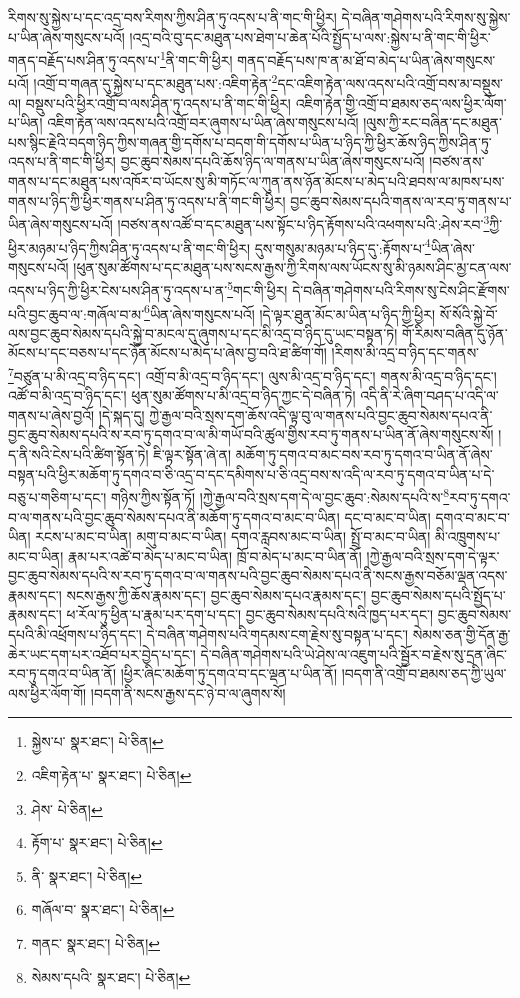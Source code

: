 རིགས་སུ་སྐྱེས་པ་དང་འདྲ་བས་རིགས་ཀྱིས་ཤིན་ཏུ་འདས་པ་ནི་གང་གི་ཕྱིར། དེ་བཞིན་གཤེགས་པའི་རིགས་སུ་སྐྱེས་པ་ཡིན་ཞེས་གསུངས་པའོ། །འདྲ་བའི་བུ་དང་མཐུན་པས་ཐེག་པ་ཆེན་པོའི་སྤྱོད་པ་ལས་:སྐྱེས་པ་ནི་གང་གི་ཕྱིར་གནད་བརྗོད་པས་ཤིན་ཏུ་འདས་པ་\footnote{སྐྱེས་པ་  སྣར་ཐང་།  པེ་ཅིན། }ནི་གང་གི་ཕྱིར། གནད་བརྗོད་པས་ཁ་ན་མ་ཐོ་བ་མེད་པ་ཡིན་ཞེས་གསུངས་པའོ། །འགྲོ་བ་གཞན་དུ་སྐྱེས་པ་དང་མཐུན་པས་:འཇིག་རྟེན་\footnote{འཇིག་རྟེན་པ་  སྣར་ཐང་།  པེ་ཅིན། }དང་འཇིག་རྟེན་ལས་འདས་པའི་འགྲོ་བས་མ་བསྡུས་ལ། བསྡུས་པའི་ཕྱིར་འགྲོ་བ་ལས་ཤིན་ཏུ་འདས་པ་ནི་གང་གི་ཕྱིར། འཇིག་རྟེན་གྱི་འགྲོ་བ་ཐམས་ཅད་ལས་ཕྱིར་ལོག་པ་ཡིན། འཇིག་རྟེན་ལས་འདས་པའི་འགྲོ་བར་ཞུགས་པ་ཡིན་ཞེས་གསུངས་པའོ། །ལུས་ཀྱི་རང་བཞིན་དང་མཐུན་པས་སྙིང་རྗེའི་བདག་ཉིད་ཀྱིས་གཞན་གྱི་དགོས་པ་བདག་གི་དགོས་པ་ཡིན་པ་ཉིད་ཀྱི་ཕྱིར་ཆོས་ཉིད་ཀྱིས་ཤིན་ཏུ་འདས་པ་ནི་གང་གི་ཕྱིར། བྱང་ཆུབ་སེམས་དཔའི་ཆོས་ཉིད་ལ་གནས་པ་ཡིན་ཞེས་གསུངས་པའོ། །བཙས་ནས་གནས་པ་དང་མཐུན་པས་འཁོར་བ་ཡོངས་སུ་མི་གཏོང་ལ་ཀུན་ནས་ཉོན་མོངས་པ་མེད་པའི་ཐབས་ལ་མཁས་པས་གནས་པ་ཉིད་ཀྱི་ཕྱིར་གནས་པ་ཤིན་ཏུ་འདས་པ་ནི་གང་གི་ཕྱིར། བྱང་ཆུབ་སེམས་དཔའི་གནས་ལ་རབ་ཏུ་གནས་པ་ཡིན་ཞེས་གསུངས་པའོ། །བཙས་ནས་འཚོ་བ་དང་མཐུན་པས་སྟོང་པ་ཉིད་རྟོགས་པའི་འཕགས་པའི་:ཤེས་རབ་\footnote{ཤེས་  པེ་ཅིན། }ཀྱི་ཕྱིར་མཉམ་པ་ཉིད་ཀྱིས་ཤིན་ཏུ་འདས་པ་ནི་གང་གི་ཕྱིར། དུས་གསུམ་མཉམ་པ་ཉིད་དུ་:རྟོགས་པ་\footnote{རྟོག་པ་  སྣར་ཐང་།  པེ་ཅིན། }ཡིན་ཞེས་གསུངས་པའོ། །ཕུན་སུམ་ཚོགས་པ་དང་མཐུན་པས་སངས་རྒྱས་ཀྱི་རིགས་ལས་ཡོངས་སུ་མི་ཉམས་ཤིང་མྱ་ངན་ལས་འདས་པ་ཉིད་ཀྱི་ཕྱིར་ངེས་པས་ཤིན་ཏུ་འདས་པ་ན་\footnote{ནི་  སྣར་ཐང་།  པེ་ཅིན། }གང་གི་ཕྱིར། དེ་བཞིན་གཤེགས་པའི་རིགས་སུ་ངེས་ཤིང་རྫོགས་པའི་བྱང་ཆུབ་ལ་:གཞོལ་བ་མ་\footnote{གཞོལ་བ་  སྣར་ཐང་།  པེ་ཅིན། }ཡིན་ཞེས་གསུངས་པའོ། །དེ་ལྟར་ཐུན་མོང་མ་ཡིན་པ་ཉིད་ཀྱི་ཕྱིར། སོ་སོའི་སྐྱེ་བོ་ལས་བྱང་ཆུབ་སེམས་དཔའི་སྐྱེ་བ་མངལ་དུ་ཞུགས་པ་དང་མི་འདྲ་བ་ཉིད་དུ་ཡང་བསྟན་ཏེ། གོ་རིམས་བཞིན་དུ་ཉོན་མོངས་པ་དང་བཅས་པ་དང་ཉོན་མོངས་པ་མེད་པ་ཞེས་བྱ་བའི་ཐ་ཚིག་གོ། །རིགས་མི་འདྲ་བ་ཉིད་དང་གནས་\footnote{གནང་  སྣར་ཐང་།  པེ་ཅིན། }བཙུན་པ་མི་འདྲ་བ་ཉིད་དང་། འགྲོ་བ་མི་འདྲ་བ་ཉིད་དང་། ལུས་མི་འདྲ་བ་ཉིད་དང་། གནས་མི་འདྲ་བ་ཉིད་དང་། འཚོ་བ་མི་འདྲ་བ་ཉིད་དང་། ཕུན་སུམ་ཚོགས་པ་མི་འདྲ་བ་ཉིད་ཀྱང་དེ་བཞིན་ཏེ། འདི་ནི་རེ་ཞིག་བཤད་པ་འདི་ལ་གནས་པ་ཞེས་བྱའོ། །དེ་སྐད་དུ། ཀྱེ་རྒྱལ་བའི་སྲས་དག་ཆོས་འདི་ལྟ་བུ་ལ་གནས་པའི་བྱང་ཆུབ་སེམས་དཔའ་ནི་བྱང་ཆུབ་སེམས་དཔའི་ས་རབ་ཏུ་དགའ་བ་ལ་མི་གཡོ་བའི་ཚུལ་གྱིས་རབ་ཏུ་གནས་པ་ཡིན་ནོ་ཞེས་གསུངས་སོ། །ད་ནི་སའི་ངེས་པའི་ཚིག་སྟོན་ཏེ། ཇི་ལྟར་སྟོན་ཞེ་ན། མཆོག་ཏུ་དགའ་བ་མང་བས་རབ་ཏུ་དགའ་བ་ཡིན་ནོ་ཞེས་བསྟན་པའི་ཕྱིར་མཆོག་ཏུ་དགའ་བ་ཅི་འདྲ་བ་དང་དམིགས་པ་ཅི་འདྲ་བས་ས་འདི་ལ་རབ་ཏུ་དགའ་བ་ཡིན་པ་དེ་བཅུ་པ་གཅིག་པ་དང་། གཉིས་ཀྱིས་སྟོན་ཏོ། །ཀྱེ་རྒྱལ་བའི་སྲས་དག་དེ་ལ་བྱང་ཆུབ་:སེམས་དཔའི་ས་\footnote{སེམས་དཔའི་  སྣར་ཐང་།  པེ་ཅིན། }རབ་ཏུ་དགའ་བ་ལ་གནས་པའི་བྱང་ཆུབ་སེམས་དཔའ་ནི་མཆོག་ཏུ་དགའ་བ་མང་བ་ཡིན། དང་བ་མང་བ་ཡིན། དགའ་བ་མང་བ་ཡིན། རངས་པ་མང་བ་ཡིན། མགུ་བ་མང་བ་ཡིན། དགའ་རླབས་མང་བ་ཡིན། སྤྲོ་བ་མང་བ་ཡིན། མི་འཁྲུགས་པ་མང་བ་ཡིན། རྣམ་པར་འཚེ་བ་མེད་པ་མང་བ་ཡིན། ཁྲོ་བ་མེད་པ་མང་བ་ཡིན་ནོ། །ཀྱེ་རྒྱལ་བའི་སྲས་དག་དེ་ལྟར་བྱང་ཆུབ་སེམས་དཔའི་ས་རབ་ཏུ་དགའ་བ་ལ་གནས་པའི་བྱང་ཆུབ་སེམས་དཔའ་ནི་སངས་རྒྱས་བཅོམ་ལྡན་འདས་རྣམས་དང་། སངས་རྒྱས་ཀྱི་ཆོས་རྣམས་དང་། བྱང་ཆུབ་སེམས་དཔའ་རྣམས་དང་། བྱང་ཆུབ་སེམས་དཔའི་སྤྱོད་པ་རྣམས་དང་། ཕ་རོལ་ཏུ་ཕྱིན་པ་རྣམ་པར་དག་པ་དང་། བྱང་ཆུབ་སེམས་དཔའི་སའི་ཁྱད་པར་དང་། བྱང་ཆུབ་སེམས་དཔའི་མི་འཕྲོགས་པ་ཉིད་དང་། དེ་བཞིན་གཤེགས་པའི་གདམས་ངག་རྗེས་སུ་བསྟན་པ་དང་། སེམས་ཅན་གྱི་དོན་རྒྱ་ཆེར་ཡང་དག་པར་འཐོབ་པར་བྱེད་པ་དང་། དེ་བཞིན་གཤེགས་པའི་ཡེ་ཤེས་ལ་འཇུག་པའི་སྦྱོར་བ་རྗེས་སུ་དྲན་ཞིང་རབ་ཏུ་དགའ་བ་ཡིན་ནོ། །ཕྱིར་ཞིང་མཆོག་ཏུ་དགའ་བ་དང་ལྡན་པ་ཡིན་ནོ། །བདག་ནི་འགྲོ་བ་ཐམས་ཅད་ཀྱི་ཡུལ་ལས་ཕྱིར་ལོག་གོ། །བདག་ནི་སངས་རྒྱས་དང་ཉེ་བ་ལ་ཞུགས་སོ། 